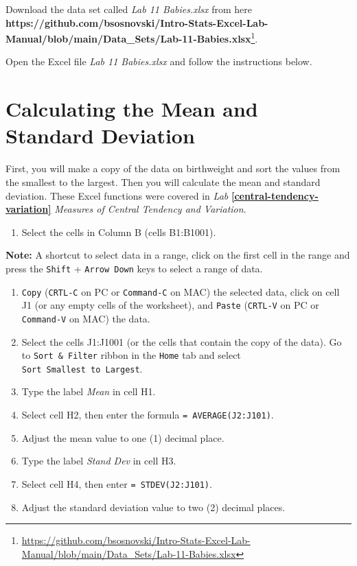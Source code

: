 \documentclass[
  12pt,
  letterpaper,
]{book}
\providecommand{\tightlist}{%
  \setlength{\itemsep}{0pt}\setlength{\parskip}{0pt}}
\DeclareRobustCommand{\href}[2]{#2\footnote{\url{#1}}}
\begin{document}
Download the data set called \emph{Lab 11 Babies.xlsx} from here \href{https://github.com/bsosnovski/Intro-Stats-Excel-Lab-Manual/blob/main/Data_Sets/Lab-11-Babies.xlsx}{\textbf{https://github.com/bsosnovski/Intro-Stats-Excel-Lab-Manual/blob/main/Data\_Sets/Lab-11-Babies.xlsx}}.

Open the Excel file \emph{Lab 11 Babies.xlsx} and follow the instructions below.

\hypertarget{calculating-the-mean-and-standard-deviation}{%
\section{Calculating the Mean and Standard Deviation}\label{calculating-the-mean-and-standard-deviation}}

First, you will make a copy of the data on birthweight and sort the values from the smallest to the largest. Then you will calculate the mean and standard deviation. These Excel functions were covered in \emph{Lab} \textbf{\ref{central-tendency-variation}} \emph{Measures of Central Tendency and Variation}.

\begin{enumerate}
\def\labelenumi{\arabic{enumi}.}
\tightlist
\item
  Select the cells in Column B (cells B1:B1001).
\end{enumerate}

\textbf{Note:} A shortcut to select data in a range, click on the first cell in the range and press the \texttt{Shift} + \texttt{Arrow\ Down} keys to select a range of data.

\begin{enumerate}
\def\labelenumi{\arabic{enumi}.}
\setcounter{enumi}{1}
\tightlist
\item
  \texttt{Copy} (\texttt{CRTL-C} on PC or \texttt{Command-C} on MAC) the selected data, click on cell J1 (or any empty cells of the worksheet), and \texttt{Paste} (\texttt{CRTL-V} on PC or \texttt{Command-V} on MAC) the data.
\item
  Select the cells J1:J1001 (or the cells that contain the copy of the data). Go to \texttt{Sort\ \&\ Filter} ribbon in the \texttt{Home} tab and select \texttt{Sort\ Smallest\ to\ Largest}.
\item
  Type the label \emph{Mean} in cell H1.
\item
  Select cell H2, then enter the formula \texttt{=\ AVERAGE(J2:J101)}.
\item
  Adjust the mean value to one (1) decimal place.
\item
  Type the label \emph{Stand Dev} in cell H3.
\item
  Select cell H4, then enter \texttt{=\ STDEV(J2:J101)}.
\item
  Adjust the standard deviation value to two (2) decimal places.
\end{enumerate}
\end{document}
